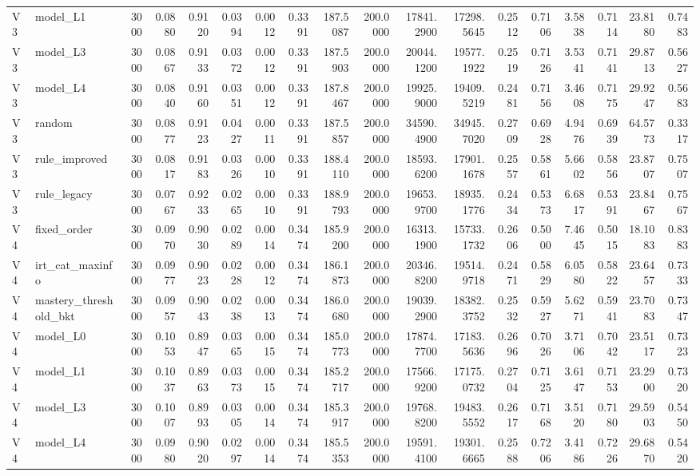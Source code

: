 \begin{table}
\begin{tabular}{llrrrrrrrrrrrrrrrr}
V3 & model\_L1 & 3000 & 0.0880 & 0.9120 & 0.0394 & 0.0012 & 0.3391 & 187.5087 & 200.0000 & 17841.2900 & 17298.5645 & 0.2512 & 0.7106 & 3.5838 & 0.7114 & 23.8180 & 0.7483 \\
V3 & model\_L3 & 3000 & 0.0867 & 0.9133 & 0.0372 & 0.0012 & 0.3391 & 187.5903 & 200.0000 & 20044.1200 & 19577.1922 & 0.2519 & 0.7126 & 3.5341 & 0.7141 & 29.8713 & 0.5627 \\
V3 & model\_L4 & 3000 & 0.0840 & 0.9160 & 0.0351 & 0.0012 & 0.3391 & 187.8467 & 200.0000 & 19925.9000 & 19409.5219 & 0.2481 & 0.7156 & 3.4608 & 0.7175 & 29.9247 & 0.5683 \\
V3 & random & 3000 & 0.0877 & 0.9123 & 0.0427 & 0.0011 & 0.3391 & 187.5857 & 200.0000 & 34590.4900 & 34945.7020 & 0.2709 & 0.6928 & 4.9476 & 0.6939 & 64.5773 & 0.3317 \\
V3 & rule\_improved & 3000 & 0.0817 & 0.9183 & 0.0326 & 0.0010 & 0.3391 & 188.4110 & 200.0000 & 18593.6200 & 17901.1678 & 0.2557 & 0.5861 & 5.6602 & 0.5856 & 23.8707 & 0.7507 \\
V3 & rule\_legacy & 3000 & 0.0767 & 0.9233 & 0.0265 & 0.0010 & 0.3391 & 188.9793 & 200.0000 & 19653.9700 & 18935.1776 & 0.2434 & 0.5373 & 6.6817 & 0.5391 & 23.8467 & 0.7567 \\
V4 & fixed\_order & 3000 & 0.0970 & 0.9030 & 0.0289 & 0.0014 & 0.3474 & 185.9200 & 200.0000 & 16313.1900 & 15733.1732 & 0.2606 & 0.5000 & 7.4645 & 0.5015 & 18.1083 & 0.8383 \\
V4 & irt\_cat\_maxinfo & 3000 & 0.0977 & 0.9023 & 0.0228 & 0.0012 & 0.3474 & 186.1873 & 200.0000 & 20346.8200 & 19514.9718 & 0.2471 & 0.5829 & 6.0580 & 0.5822 & 23.6457 & 0.7333 \\
V4 & mastery\_threshold\_bkt & 3000 & 0.0957 & 0.9043 & 0.0238 & 0.0013 & 0.3474 & 186.0680 & 200.0000 & 19039.2900 & 18382.3752 & 0.2532 & 0.5927 & 5.6271 & 0.5941 & 23.7083 & 0.7347 \\
V4 & model\_L0 & 3000 & 0.1053 & 0.8947 & 0.0365 & 0.0015 & 0.3474 & 185.0773 & 200.0000 & 17874.7700 & 17183.5636 & 0.2696 & 0.7026 & 3.7106 & 0.7042 & 23.5117 & 0.7323 \\
V4 & model\_L1 & 3000 & 0.1037 & 0.8963 & 0.0373 & 0.0015 & 0.3474 & 185.2717 & 200.0000 & 17566.9200 & 17175.0732 & 0.2704 & 0.7125 & 3.6147 & 0.7153 & 23.2900 & 0.7320 \\
V4 & model\_L3 & 3000 & 0.1007 & 0.8993 & 0.0305 & 0.0014 & 0.3474 & 185.3917 & 200.0000 & 19768.8200 & 19483.5552 & 0.2617 & 0.7168 & 3.5120 & 0.7180 & 29.5903 & 0.5450 \\
V4 & model\_L4 & 3000 & 0.0980 & 0.9020 & 0.0297 & 0.0014 & 0.3474 & 185.5353 & 200.0000 & 19591.4100 & 19301.6665 & 0.2588 & 0.7206 & 3.4186 & 0.7226 & 29.6870 & 0.5420 \\

\end{tabular}
\end{table}
